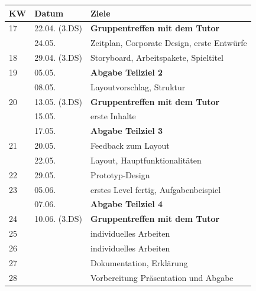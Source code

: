 \documentclass[10pt,a4paper,notitlepage]{report}
\begin{document}
	\begin{tabular}{l|l|l}\hline
 	 KW & Datum & Ziele\\\hline
	17 & 22.04. (3.DS) & \textbf{Gruppentreffen mit dem Tutor}\\
	& 24.05. & Zeitplan, Corporate Design, erste Entwürfe\\\hline
	18 & 29.04. (3.DS) &  Storyboard, Arbeitspakete, Spieltitel\\\hline
	19 & 05.05. & \textbf{Abgabe Teilziel 2}\\
	& 08.05. & Layoutvorschlag, Struktur\\\hline
	20 & 13.05. (3.DS) & \textbf{Gruppentreffen mit dem Tutor}\\
	& 15.05. & erste Inhalte\\
	& 17.05. & \textbf{Abgabe Teilziel 3}\\\hline
	21 & 20.05. & Feedback zum Layout\\
	& 22.05. & Layout, Hauptfunktionalitäten\\\hline
	22 & 29.05. & Prototyp-Design\\\hline
	23 & 05.06. & erstes Level fertig, Aufgabenbeispiel\\
	& 07.06. & \textbf{Abgabe Teilziel 4}\\\hline
	24 & 10.06. (3.DS) & \textbf{Gruppentreffen mit dem Tutor}\\\hline
	25 & & individuelles Arbeiten\\\hline
	26 & & individuelles Arbeiten\\\hline
	27 & & Dokumentation, Erklärung\\\hline
	28 & & Vorbereitung Präsentation und Abgabe\\
	 \end{tabular}
	\\
	\\
	\\
	\\
	\\
	\\
	\\
	\Fusszeile
\end{document}
